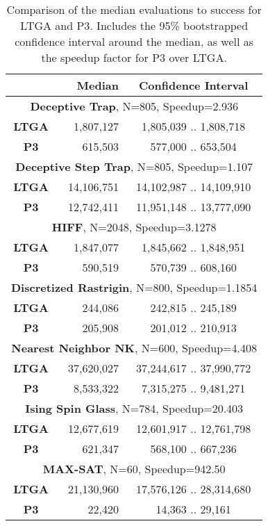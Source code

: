 \documentclass{sig-alternate}
\begin{document}
\begin{table}
	\centering
	\begin{tabular}{|c|r|c|}
	  \hline
	                & \textbf{Median} & \textbf{Confidence Interval} \\ \hline
    \multicolumn{3}{|c|}{\textbf{Deceptive Trap}, N=805, Speedup=2.936} \\ \hline
\textbf{LTGA} & 1,807,127 & 1,805,039 .. 1,808,718 \\ \hline
\textbf{P3} & 615,503 & 577,000 .. 653,504 \\ \hline\hline
    \multicolumn{3}{|c|}{\textbf{Deceptive Step Trap}, N=805, Speedup=1.107} \\ \hline
\textbf{LTGA} & 14,106,751 & 14,102,987 .. 14,109,910 \\ \hline
\textbf{P3} & 12,742,411 & 11,951,148 .. 13,777,090 \\ \hline\hline
    \multicolumn{3}{|c|}{\textbf{HIFF}, N=2048, Speedup=3.1278} \\ \hline
\textbf{LTGA} & 1,847,077 & 1,845,662 .. 1,848,951 \\ \hline
\textbf{P3} & 590,519 & 570,739 .. 608,160 \\ \hline\hline
    \multicolumn{3}{|c|}{\textbf{Discretized Rastrigin}, N=800, Speedup=1.1854} \\ \hline
\textbf{LTGA} & 244,086 & 242,815 .. 245,189 \\ \hline
\textbf{P3} & 205,908 & 201,012 .. 210,913 \\ \hline\hline
    \multicolumn{3}{|c|}{\textbf{Nearest Neighbor NK}, N=600, Speedup=4.408} \\ \hline
\textbf{LTGA} & 37,620,027 & 37,244,617 .. 37,990,772 \\ \hline
\textbf{P3} & 8,533,322 & 7,315,275 .. 9,481,271 \\ \hline\hline
    \multicolumn{3}{|c|}{\textbf{Ising Spin Glass}, N=784, Speedup=20.403} \\ \hline
\textbf{LTGA} & 12,677,619 & 12,601,917 .. 12,761,798 \\ \hline
\textbf{P3} & 621,347 & 568,100 .. 667,236 \\ \hline\hline
    \multicolumn{3}{|c|}{\textbf{MAX-SAT}, N=60, Speedup=942.50} \\ \hline
\textbf{LTGA} & 21,130,960 & 17,576,126 .. 28,314,680 \\ \hline
\textbf{P3} & 22,420 & 14,363 .. 29,161 \\ \hline

  \end{tabular}
	\caption{Comparison of the median evaluations to success for LTGA and P3.  Includes
        	the 95\% bootstrapped confidence interval around the median, as well as
        	the speedup factor for P3 over LTGA.}
	\label{table-results}
\end{table}
\end{document}
